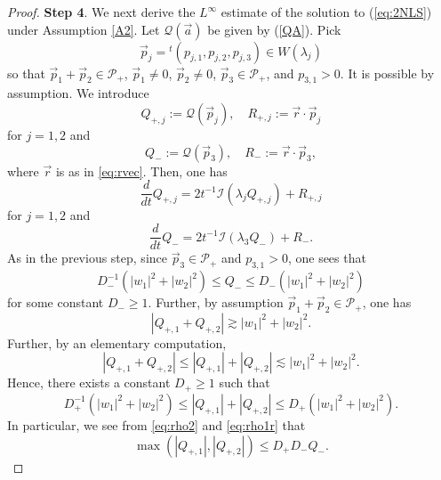 \documentclass[11pt,a4paper,twosides]{amsart}
\theoremstyle{plain}
\theoremstyle{remark}
\numberwithin{equation}{section}
\renewcommand{\Im}{\operatorname{Im}}
\renewcommand{\Re}{\operatorname{Re}}
\def\le{\leqslant}
\def\ge{\geqslant}
\theoremstyle{definition}
\newcommand{\1}{{\bf 1}_{\{|x| < |t|\}}}
\newcommand{\ol}{\overline}
\begin{document}
\begin{proof}
 {\bf Step 4}. We next derive the $L^\infty$ estimate of the solution 
 to (\ref{eq:2NLS}) under Assumption \ref{A2}. 
  Let 
	$\mathcal{Q}(\vec{a})$ be given by (\ref{QA}).
  Pick
 \[
	\vec{p}_j = {}^t\!(
	p_{j,1} ,
	p_{j,2} ,
	p_{j,3} 
	)
	\in W(\lambda_j) 
\]
so that 
$\vec{p}_1 + \vec{p}_2 \in \mathcal{P}_+$, $\vec{p}_{1}\neq0$, $\vec{p}_2\neq0$,
$\vec{p}_3 \in \mathcal{P}_+$, and $p_{3,1}>0$.
It is possible by assumption.
We introduce
\[
	Q_{+,j} := \mathcal{Q}(\vec{p}_j), \quad
	R_{+,j}:= \vec{r} \cdot \vec{p}_{j}
\]
for $j=1,2$ and
\[
	Q_{-} := \mathcal{Q}(\vec{p}_3), \quad R_{-}:= \vec{r} \cdot \vec{p}_3,
\]
where $\vec{r}$ is as in \eqref{eq:rvec}.
Then, one has
\begin{equation}\label{eq:tildeode2}
	\frac{d}{dt} Q_{+,j} = 2t^{-1} \mathcal{I} (\lambda_j  Q_{+,j}) + R_{+,j}
\end{equation}
for $j=1,2$ and
\begin{equation}\label{eq:tildeode3}
	\frac{d}{dt} Q_{-} = 2t^{-1} \mathcal{I} (\lambda_3  Q_{-}) + R_{-}.
\end{equation}
As in the previous step, since
$\vec{p}_3 \in \mathcal{P}_+$ and $p_{3,1}>0$, one sees that
 \begin{equation}\label{eq:rho2}   D_-^{-1} (|w_1|^2 + |w_2|^2) \le Q_- \le D_-(|w_1|^2 + |w_2|^2)
  \end{equation}
  for some constant $D_-\ge1$.
  Further,
by assumption $\vec{p}_1 + \vec{p}_2 \in \mathcal{P}_+$,
one has
\[
	|Q_{+,1} + Q_{+,2}| \gtrsim |w_1|^2 + |w_2|^2.
\]
Further, by an elementary computation,
\[
	|Q_{+,1} + Q_{+,2}|
	\le |Q_{+,1}| + |Q_{+,2}| \lesssim |w_1|^2 + |w_2|^2.
\]
Hence, there exists a constant $D_+\ge 1$ such that
\begin{equation}\label{eq:rho1r} 
 D_+^{-1}(|w_1|^2 + |w_2|^2) \le |Q_{+,1}| + |Q_{+,2}| \le D_+(|w_1|^2 + |w_2|^2).
\end{equation}
In particular, we see from \eqref{eq:rho2} and \eqref{eq:rho1r} that
\begin{equation}\label{eq:rho3}
	\max (|Q_{+,1}| , |Q_{+,2}|) \le D_+D_- Q_{-}.
\end{equation}


\end{proof}
\end{document}
